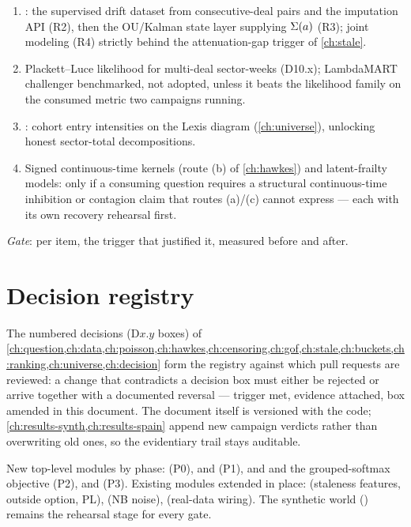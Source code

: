 \begin{enumerate}[label=P3.\arabic*,leftmargin=3.2em]
\item {}: the supervised drift dataset from
consecutive-deal pairs and the imputation API (R2), then the OU/Kalman
state layer supplying $\Sigma(a)$ (R3); joint modeling (R4)
strictly behind the attenuation-gap trigger of \cref{ch:stale}.
\item Plackett--Luce likelihood for multi-deal sector-weeks (D10.x);
LambdaMART challenger benchmarked, not adopted, unless it beats the
likelihood family on the consumed metric two campaigns running.
\item {}: cohort entry intensities on the Lexis
diagram (\cref{ch:universe}), unlocking honest sector-total decompositions.
\item Signed continuous-time kernels (route (b) of \cref{ch:hawkes})
and latent-frailty models: only if a consuming question requires a
structural continuous-time inhibition or contagion claim that routes
(a)/(c) cannot express --- each with its own recovery rehearsal first.
\end{enumerate}

\emph{Gate}: per item, the trigger that justified it, measured before
and after.

\section{Decision registry}\label{ch13:sec:registry}

The numbered decisions (D$x$.$y$ boxes) of
\cref{ch:question,ch:data,ch:poisson,ch:hawkes,ch:censoring,ch:gof,ch:stale,ch:buckets,ch:ranking,ch:universe,ch:decision}
form the registry against which pull requests are reviewed: a change
that contradicts a decision box must either be rejected or arrive
together with a documented reversal --- trigger met, evidence
attached, box amended in this document. The document itself is
versioned with the code; \cref{ch:results-synth,ch:results-spain}
append new campaign verdicts rather than overwriting old ones, so the
evidentiary trail stays auditable.

\begin{codehooks}
New top-level modules by phase:  (P0),
 and  (P1),
 and  and the grouped-softmax
objective (P2),  and  (P3).
Existing modules extended in place: 
(staleness features, outside option, PL), 
(NB noise),  (real-data wiring). The synthetic world
() remains the rehearsal stage for every gate.
\end{codehooks}
